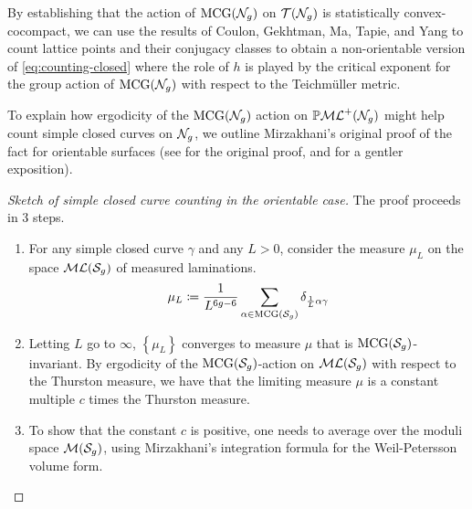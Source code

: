 By establishing that the action of $\mathrm{MCG}(\mathcal{N}_g)$ on $\mathcal{T}(\mathcal{N}_g)$ is statistically convex-cocompact, we can use the results of Coulon, Gekhtman, Ma, Tapie, and Yang to count lattice points and their conjugacy classes to obtain a non-orientable version of \eqref{eq:counting-closed} where the role of $h$ is played by the critical exponent for the group action of $\mathrm{MCG}(\mathcal{N}_g)$ with respect to the Teichmüller metric.

To explain how ergodicity of the $\mathrm{MCG}(\mathcal{N}_g)$ action on $\mathbb{P}\mathcal{ML}^+(\mathcal{N}_g)$ might help count simple closed curves on $\mathcal{N}_g$, we outline Mirzakhani's original proof of the fact for orientable surfaces (see \cite{mirzakhani2008growth} for the original proof, and \cite{2022arXiv220204156A} for a gentler exposition).

\begin{proof}[Sketch of simple closed curve counting in the orientable case]
  The proof proceeds in 3 steps.
  \begin{enumerate}[Step 1:]
  \item For any simple closed curve $\gamma$ and any $L > 0$, consider the measure $\mu_L$ on the space $\mathcal{ML}(\mathcal{S}_g)$ of measured laminations.
    \begin{align*}
      \mu_L \coloneqq \frac{1}{L^{6g-6}} \sum_{\alpha \in \mathrm{MCG}(\mathcal{S}_g)} \delta_{\frac{1}{L}\alpha \gamma}
    \end{align*}
  \item Letting $L$ go to $\infty$, $\left\{ \mu_L \right\}$ converges to measure $\mu$ that is $\mathrm{MCG}(\mathcal{S}_g)$-invariant.
    By ergodicity of the $\mathrm{MCG}(\mathcal{S}_g)$-action on $\mathcal{ML}(\mathcal{S}_g)$ with respect to the Thurston measure, we have that the limiting measure $\mu$ is a constant multiple $c$ times the Thurston measure.
  \item To show that the constant $c$ is positive, one needs to average over the moduli space $\mathcal{M}(\mathcal{S}_g)$, using Mirzakhani's integration formula for the Weil-Petersson volume form.
  \end{enumerate}
\end{proof}

